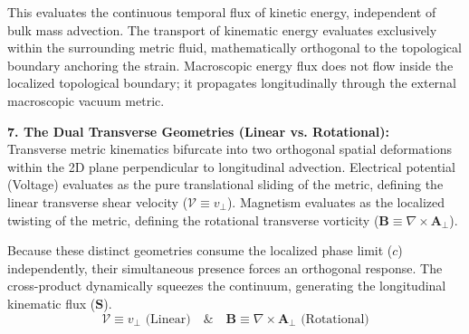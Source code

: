 \documentclass[11pt, a4paper]{article}
\begin{document}
This evaluates the continuous temporal flux of kinetic energy, independent of bulk mass advection. The transport of kinematic energy evaluates exclusively within the surrounding metric fluid, mathematically orthogonal to the topological boundary anchoring the strain. Macroscopic energy flux does not flow inside the localized topological boundary; it propagates longitudinally through the external macroscopic vacuum metric.

\textbf{7. The Dual Transverse Geometries (Linear vs. Rotational):} \\
Transverse metric kinematics bifurcate into two orthogonal spatial deformations within the 2D plane perpendicular to longitudinal advection. Electrical potential (Voltage) evaluates as the pure translational sliding of the metric, defining the linear transverse shear velocity ($\mathcal{V} \equiv v_{\perp}$). Magnetism evaluates as the localized twisting of the metric, defining the rotational transverse vorticity ($\mathbf{B} \equiv \nabla \times \mathbf{A}_{\perp}$). 

Because these distinct geometries consume the localized phase limit ($c$) independently, their simultaneous presence forces an orthogonal response. The cross-product dynamically squeezes the continuum, generating the longitudinal kinematic flux ($\mathbf{S}$).
\begin{equation}
    \mathcal{V} \equiv v_{\perp} \text{ (Linear)} \quad \text{\&} \quad \mathbf{B} \equiv \nabla \times \mathbf{A}_{\perp} \text{ (Rotational)} \label{eq:dual_transverse}
\end{equation}
\end{document}
